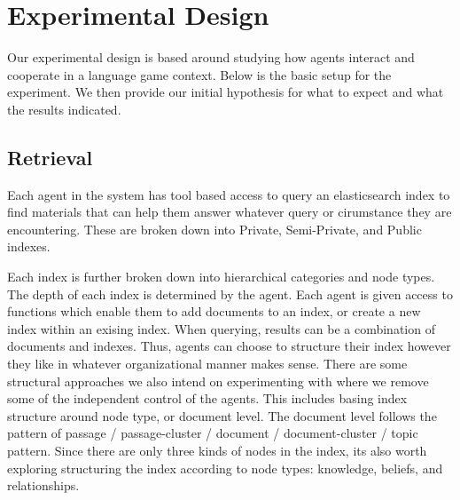 \section{Experimental Design}

Our experimental design is based around studying how agents interact and cooperate in a language game context. Below is the basic setup for the experiment.
We then provide our initial hypothesis for what to expect and what the results indicated.

\subsection{Retrieval}
Each agent in the system has tool based access to query an elasticsearch index to find materials that can help them answer whatever query or cirumstance they are encountering. These are broken down into Private, Semi-Private, and Public indexes.



Each index is further broken down into hierarchical categories and node types. The depth of each index is determined by the agent. Each agent is given access to functions which enable them to add documents to an index, or create a new index within an exising index. When querying, results can be a combination of documents and indexes. Thus, agents can choose to structure their index however they like in whatever organizational manner makes sense. There are some structural approaches we also intend on experimenting with where we remove some of the independent control of the agents. This includes basing index structure around node type, or document level. The document level follows the pattern of passage / passage-cluster / document / document-cluster / topic pattern. Since there are only three kinds of nodes in the index, its also worth exploring structuring the index according to node types: knowledge, beliefs, and relationships.

